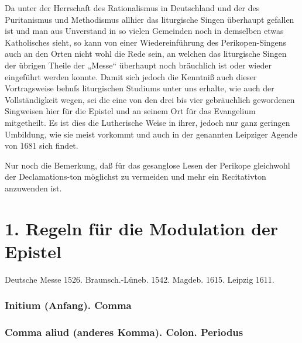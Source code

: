 Da unter der Herrschaft des Rationalismus in Deutschland und der des Puritanismus und Methodismus allhier das liturgische Singen überhaupt gefallen ist und man aus Unverstand in so vielen Gemeinden noch in demselben etwas Katholisches sieht, so kann von einer Wiedereinführung des Perikopen-Singens auch an den Orten nicht wohl die Rede sein, an welchen das liturgische Singen der übrigen Theile der „Messe“ überhaupt noch bräuchlich ist oder wieder eingeführt werden konnte. Damit sich jedoch die Kenntniß auch dieser Vortragsweise behufs liturgischen Studiums unter uns erhalte, wie auch der Vollständigkeit wegen, sei die eine von den drei bis vier gebräuchlich gewordenen Singweisen hier für die Epistel und an seinem Ort für das Evangelium mitgetheilt. Es ist dies die Lutherische Weise in ihrer, jedoch nur ganz geringen Umbildung, wie sie meist vorkommt und auch in der genannten Leipziger Agende von 1681 sich findet.

Nur noch die Bemerkung, daß für das gesanglose Lesen der Perikope gleichwohl der Declamations-ton möglichst zu vermeiden und mehr ein Recitativton anzuwenden ist.

\section{1. Regeln für die Modulation der Epistel}

Deutsche Messe 1526. Braunsch.-Lüneb. 1542. Magdeb. 1615. Leipzig 1611.

\subsubsection{Initium (Anfang). Comma}



\subsubsection[Comma aliud. Colon. Periodus]{Comma aliud (anderes Komma). Colon. Periodus}




